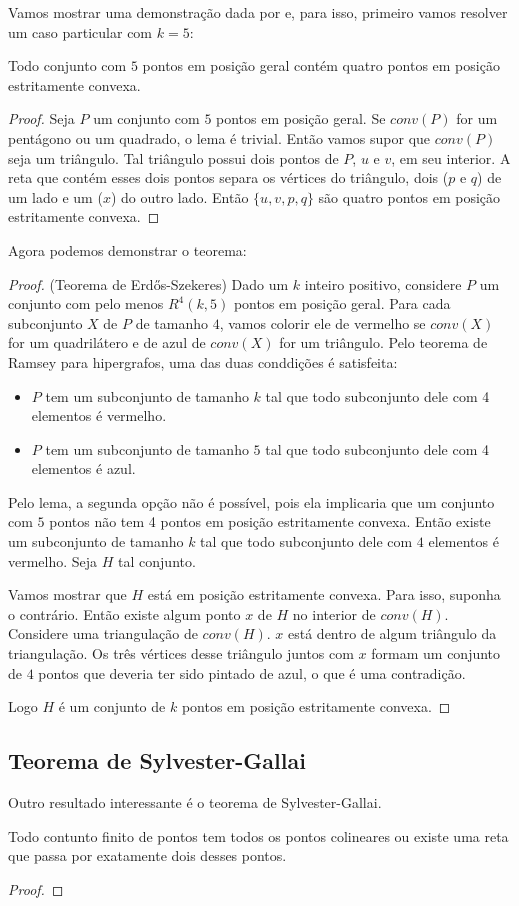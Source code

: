 Vamos mostrar uma demonstração dada por \cite{ES} e, para isso, primeiro vamos resolver um caso particular com $k=5$:
\begin{lema}
    Todo conjunto com $5$ pontos em posição geral contém quatro pontos em posição estritamente convexa.
\end{lema}
\begin{proof}
    Seja $P$ um conjunto com $5$ pontos em posição geral. Se $conv(P)$ for um pentágono ou um quadrado, o lema é trivial.
    Então vamos supor que $conv(P)$ seja um triângulo. Tal triângulo possui dois pontos de $P$, $u$ e $v$, em seu interior. A reta que contém esses dois pontos separa os vértices do triângulo, dois ($p$ e $q$) de um lado e um ($x$) do outro lado. Então $\{u,v,p,q\}$ são quatro pontos em posição estritamente convexa.
\end{proof}

Agora podemos demonstrar o teorema:
\begin{proof}(Teorema de Erd\H os-Szekeres)
    Dado um $k$ inteiro positivo, considere $P$ um conjunto com pelo menos $R^4(k,5)$ pontos em posição geral. Para cada subconjunto $X$ de $P$ de tamanho $4$, vamos colorir ele de vermelho se $conv(X)$ for um quadrilátero e de azul de $conv(X)$ for um triângulo. Pelo teorema de Ramsey para hipergrafos, uma das duas conddições é satisfeita:
    \begin{itemize}
        \item $P$ tem um subconjunto de tamanho $k$ tal que todo subconjunto dele com 4 elementos é vermelho.
        \item $P$ tem um subconjunto de tamanho $5$ tal que todo subconjunto dele com 4 elementos é azul.
    \end{itemize}
    Pelo lema, a segunda opção não é possível, pois ela implicaria que um conjunto com $5$ pontos não tem 4 pontos em posição estritamente convexa. Então existe um subconjunto de tamanho $k$ tal que todo subconjunto dele com $4$ elementos é vermelho. Seja $H$ tal conjunto.

    Vamos mostrar que $H$ está em posição estritamente convexa. Para isso, suponha o contrário. Então existe algum ponto $x$ de $H$ no interior de $conv(H)$. Considere uma triangulação de $conv(H)$. $x$ está dentro de algum triângulo da triangulação. Os três vértices desse triângulo juntos com $x$ formam um conjunto de $4$ pontos que deveria ter sido pintado de azul, o que é uma contradição.

    Logo $H$ é um conjunto de $k$ pontos em posição estritamente convexa.
\end{proof}

\subsection{Teorema de Sylvester-Gallai}
Outro resultado interessante é o teorema de Sylvester-Gallai.
\begin{teorema}   
    Todo contunto finito de pontos tem todos os pontos colineares ou existe uma reta que passa por exatamente dois desses pontos.
\end{teorema}
\begin{proof}

\end{proof}

